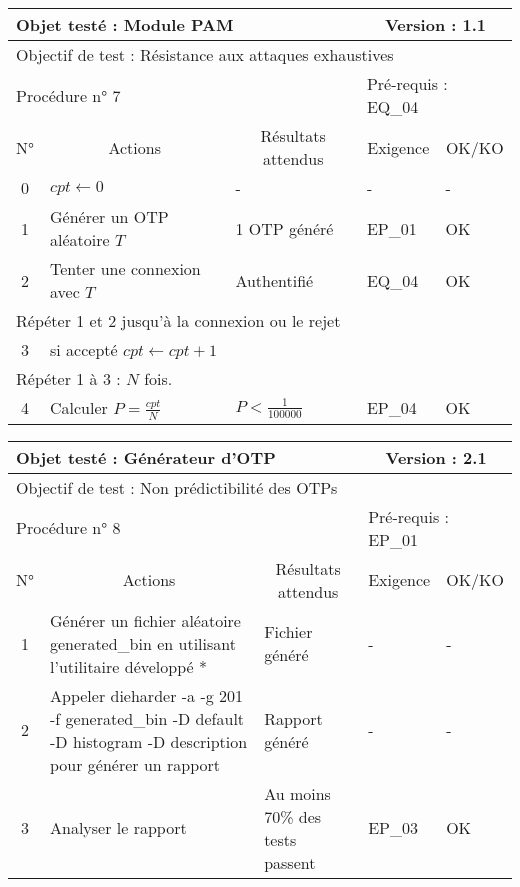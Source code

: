 \documentclass{"../../res/univ-projet"}
\begin{document}
\begin{center}
    \vskip 2.2cm 
    \begin{tabular}{|c|p{5cm}|p{5cm}|p{1.5cm}|p{1.5cm}|}
      \hline
      \multicolumn{3}{|l|}{Objet testé : Module PAM} & \multicolumn{2}{c|}{Version : 1.1}\\ \hline
      \multicolumn{5}{|l|}{Objectif de test : Résistance aux attaques exhaustives}\\ \hline
      \multicolumn{3}{|l|}{Procédure n° 7} & \multicolumn{2}{p{3cm}|}{Pré-requis : EQ\_04 }\\ \hline
      \multicolumn{1}{|c|}{N°} & \multicolumn{1}{c|}{Actions} & \multicolumn{1}{c|}{Résultats attendus} & 
      \multicolumn{1}{c|}{Exigence} & \multicolumn{1}{c|}{OK/KO}\\ \hline
      0 & $cpt \leftarrow 0$ & - & - & -\\
      1 & Générer un OTP aléatoire $T$ & 1 OTP généré & EP\_01 & OK\\
      2 & Tenter une connexion avec $T$ & Authentifié & EQ\_04 & OK \\ \hline      
      \multicolumn{5}{|l|}{Répéter 1 et 2 jusqu'à la connexion ou le rejet}\\
      \hline
      3 & si accepté $cpt \leftarrow cpt + 1$ & & & \\
      \hline
      \multicolumn{5}{|l|}{Répéter 1 à 3 : $N$ fois.}\\
      \hline
      4 & Calculer $P = \frac{cpt}{N}$ & $P < \frac{1}{100000}$ & EP\_04 & OK \\ \hline 
    \end{tabular}
    \vskip 2.2cm 
	\begin{tabular}{|c|p{5cm}|p{5cm}|p{1.5cm}|p{1.5cm}|}
      \hline
      \multicolumn{3}{|l|}{Objet testé : Générateur d'OTP} & \multicolumn{2}{c|}{Version : 2.1}\\ \hline
      \multicolumn{5}{|l|}{Objectif de test : Non prédictibilité des OTPs}\\ \hline
      \multicolumn{3}{|l|}{Procédure n° 8} & \multicolumn{2}{p{3cm}|}{Pré-requis : EP\_01 }\\ \hline
      \multicolumn{1}{|c|}{N°} & \multicolumn{1}{c|}{Actions} & \multicolumn{1}{c|}{Résultats attendus} & 
      \multicolumn{1}{c|}{Exigence} & \multicolumn{1}{c|}{OK/KO}\\ \hline
      1 & Générer un fichier aléatoire generated\_bin en utilisant l'utilitaire développé *& Fichier généré & - & - \\
      2 & Appeler dieharder -a -g 201 -f generated\_bin -D default -D histogram -D description pour générer un rapport
      	& Rapport généré & - & - \\
      3 & Analyser le rapport & Au moins 70\% des tests passent & EP\_03 & OK \\
      \hline
    \end{tabular} 
    

\end{center}
\end{document}

